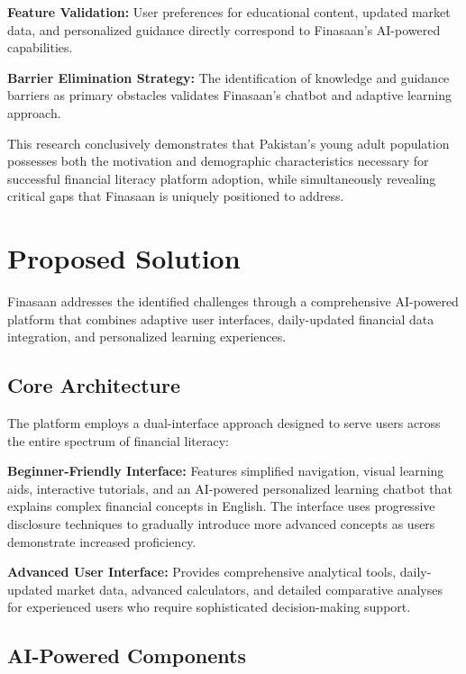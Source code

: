 \documentclass[12pt]{article}
\begin{document}
\textbf{Feature Validation:} User preferences for educational content, updated market data, and personalized guidance directly correspond to Finasaan's AI-powered capabilities.

\textbf{Barrier Elimination Strategy:} The identification of knowledge and guidance barriers as primary obstacles validates Finasaan's chatbot and adaptive learning approach.

This research conclusively demonstrates that Pakistan's young adult population possesses both the motivation and demographic characteristics necessary for successful financial literacy platform adoption, while simultaneously revealing critical gaps that Finasaan is uniquely positioned to address.

\section{Proposed Solution}
Finasaan addresses the identified challenges through a comprehensive AI-powered platform that combines adaptive user interfaces, daily-updated financial data integration, and personalized learning experiences.

\subsection{Core Architecture}

The platform employs a dual-interface approach designed to serve users across the entire spectrum of financial literacy:

\textbf{Beginner-Friendly Interface:} Features simplified navigation, visual learning aids, interactive tutorials, and an AI-powered personalized learning chatbot that explains complex financial concepts in English. The interface uses progressive disclosure techniques to gradually introduce more advanced concepts as users demonstrate increased proficiency.

\textbf{Advanced User Interface:} Provides comprehensive analytical tools, daily-updated market data, advanced calculators, and detailed comparative analyses for experienced users who require sophisticated decision-making support.

\subsection{AI-Powered Components}
\end{document}
